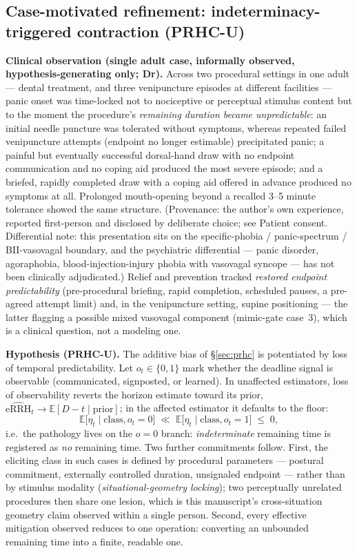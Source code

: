 \documentclass[9pt,twocolumn]{article}
\newcommand{\eRRHhat}{\widehat{\mathrm{eRRH}}}
\begin{document}
\subsection{Case-motivated refinement: indeterminacy-triggered contraction (PRHC-U)}
\label{sec:prhcu}
\textbf{Clinical observation (single adult case, informally observed, hypothesis-generating only; Dr).} Across two procedural settings in one adult --- dental treatment, and three venipuncture episodes at different facilities --- panic onset was time-locked not to nociceptive or perceptual stimulus content but to the moment the procedure's \emph{remaining duration became unpredictable}: an initial needle puncture was tolerated without symptoms, whereas repeated failed venipuncture attempts (endpoint no longer estimable) precipitated panic; a painful but eventually successful dorsal-hand draw with no endpoint communication and no coping aid produced the most severe episode; and a briefed, rapidly completed draw with a coping aid offered in advance produced no symptoms at all. Prolonged mouth-opening beyond a recalled 3--5 minute tolerance showed the same structure. (Provenance: the author's own experience, reported first-person and disclosed by deliberate choice; see Patient consent. Differential note: this presentation sits on the specific-phobia / panic-spectrum / BII-vasovagal boundary, and the psychiatric differential --- panic disorder, agoraphobia, blood-injection-injury phobia with vasovagal syncope --- has not been clinically adjudicated.) Relief and prevention tracked \emph{restored endpoint predictability} (pre-procedural briefing, rapid completion, scheduled pauses, a pre-agreed attempt limit) and, in the venipuncture setting, supine positioning --- the latter flagging a possible mixed vasovagal component (mimic-gate case~3), which is a clinical question, not a modeling one.

\textbf{Hypothesis (PRHC-U).} The additive bias of \S\ref{sec:prhc} is potentiated by loss of temporal predictability. Let $o_t\in\{0,1\}$ mark whether the deadline signal is observable (communicated, signposted, or learned). In unaffected estimators, loss of observability reverts the horizon estimate toward its prior, $\eRRHhat_t\to\mathbb E[D-t\mid \text{prior}]$; in the affected estimator it defaults to the floor:
\begin{equation}
\mathbb E\big[\eta_t \mid \text{class}, o_t=0\big]\;\ll\;\mathbb E\big[\eta_t \mid \text{class}, o_t=1\big]\;\le\;0,
\label{eq:prhcu}
\end{equation}
i.e.\ the pathology lives on the $o=0$ branch: \emph{indeterminate} remaining time is registered as \emph{no} remaining time. Two further commitments follow. First, the eliciting class in such cases is defined by procedural parameters --- postural commitment, externally controlled duration, unsignaled endpoint --- rather than by stimulus modality (\emph{situational-geometry locking}); two perceptually unrelated procedures then share one lesion, which is this manuscript's cross-situation geometry claim observed within a single person. Second, every effective mitigation observed reduces to one operation: converting an unbounded remaining time into a finite, readable one.
\end{document}
